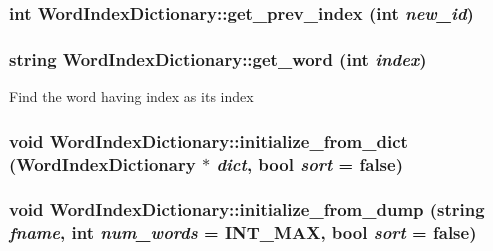 \label{class_word_index_dictionary_aa4e879ad400d0b35a5fbfb358d3bf8e2}
\hypertarget{class_word_index_dictionary_a834b4657d8c84ed3051c23668e2fe607}{
\subsubsection[{get\_\-prev\_\-index}]{\setlength{\rightskip}{0pt plus 5cm}int WordIndexDictionary::get\_\-prev\_\-index (int {\em new\_\-id})}}
\label{class_word_index_dictionary_a834b4657d8c84ed3051c23668e2fe607}
\hypertarget{class_word_index_dictionary_a58ab80daf59d8bad6cd105166c3feb8b}{
\subsubsection[{get\_\-word}]{\setlength{\rightskip}{0pt plus 5cm}string WordIndexDictionary::get\_\-word (int {\em index})}}
\label{class_word_index_dictionary_a58ab80daf59d8bad6cd105166c3feb8b}
Find the word having index as its index \hypertarget{class_word_index_dictionary_a415c20e6f67555c105cdc4da3abe730f}{
\subsubsection[{initialize\_\-from\_\-dict}]{\setlength{\rightskip}{0pt plus 5cm}void WordIndexDictionary::initialize\_\-from\_\-dict ({\bf WordIndexDictionary} $\ast$ {\em dict}, \/  bool {\em sort} = {\ttfamily false})}}
\label{class_word_index_dictionary_a415c20e6f67555c105cdc4da3abe730f}
\hypertarget{class_word_index_dictionary_abbc261e4c314aace9917fcb5c5ec127f}{
\subsubsection[{initialize\_\-from\_\-dump}]{\setlength{\rightskip}{0pt plus 5cm}void WordIndexDictionary::initialize\_\-from\_\-dump (string {\em fname}, \/  int {\em num\_\-words} = {\ttfamily INT\_\-MAX}, \/  bool {\em sort} = {\ttfamily false})}}
